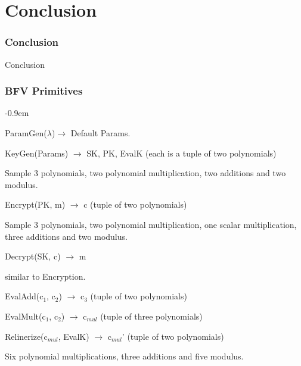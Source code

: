 \documentclass[10pt,handout]{beamer}
\newcommand{\SubItem}[1]{
    {\setlength\itemindent{15pt} \item[-] #1}
}
\begin{document}
\section{Conclusion}
\begin{frame}
    \frametitle{Conclusion}
    Conclusion
\end{frame}
\begin{frame}[noframenumbering]
    \frametitle{BFV Primitives}
\begin{itemize}\itemsep-0.9em
    \item ParamGen($\lambda$)$\rightarrow$ Default Params.
    \item KeyGen(Params) $\rightarrow$ SK, PK, EvalK (each is a tuple of two polynomials)
        \SubItem{ Sample 3 polynomials, two polynomial multiplication, two additions and two modulus.}
\pause
    \item Encrypt(PK, m) $\rightarrow$ c (tuple of two polynomials)
        \SubItem{ Sample 3 polynomials, two polynomial multiplication, one scalar multiplication, three additions and two modulus.}
    \item Decrypt(SK, c) $\rightarrow$ m
        \SubItem{ similar to Encryption.}
\pause
    \item EvalAdd(c$_1$, c$_2$) $\rightarrow$ c$_3$ (tuple of two polynomials)
    \item EvalMult(c$_1$, c$_2$) $\rightarrow$ c$_{mul}$ (tuple of three polynomials)
\pause
    \item Relinerize(c$_{mul}$, EvalK) $\rightarrow$ c$_{mul}$' (tuple of two polynomials)
        \SubItem{ Six polynomial multiplications, three additions and five modulus.}
\end{itemize}


\end{frame}


\begin{frame}[noframenumbering]
\frametitle{}

\end{frame}
\end{document}
